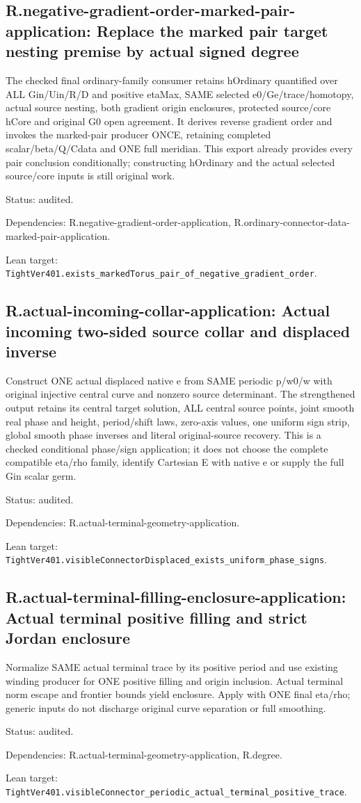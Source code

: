 \documentclass{article}
\begin{document}
\subsection*{R.negative-gradient-order-marked-pair-application: Replace the marked pair target nesting premise by actual signed degree}
The checked final ordinary-family consumer retains hOrdinary quantified over ALL Gin/Uin/R/D and positive etaMax, SAME selected e0/Ge/trace/homotopy, actual source nesting, both gradient origin enclosures, protected source/core hCore and original G0 open agreement. It derives reverse gradient order and invokes the marked-pair producer ONCE, retaining completed scalar/beta/Q/Cdata and ONE full meridian. This export already provides every pair conclusion conditionally; constructing hOrdinary and the actual selected source/core inputs is still original work.
\par Status: audited.
\par Dependencies: R.negative-gradient-order-application, R.ordinary-connector-data-marked-pair-application.
\par Lean target: \texttt{TightVer401.exists\_markedTorus\_pair\_of\_negative\_gradient\_order}.
\subsection*{R.actual-incoming-collar-application: Actual incoming two-sided source collar and displaced inverse}
Construct ONE actual displaced native e from SAME periodic p/w0/w with original injective central curve and nonzero source determinant. The strengthened output retains its central target solution, ALL central source points, joint smooth real phase and height, period/shift laws, zero-axis values, one uniform sign strip, global smooth phase inverses and literal original-source recovery. This is a checked conditional phase/sign application; it does not choose the complete compatible eta/rho family, identify Cartesian E with native e or supply the full Gin scalar germ.
\par Status: audited.
\par Dependencies: R.actual-terminal-geometry-application.
\par Lean target: \texttt{TightVer401.visibleConnectorDisplaced\_exists\_uniform\_phase\_signs}.
\subsection*{R.actual-terminal-filling-enclosure-application: Actual terminal positive filling and strict Jordan enclosure}
Normalize SAME actual terminal trace by its positive period and use existing winding producer for ONE positive filling and origin inclusion. Actual terminal norm escape and frontier bounds yield enclosure. Apply with ONE final eta/rho; generic inputs do not discharge original curve separation or full smoothing.
\par Status: audited.
\par Dependencies: R.actual-terminal-geometry-application, R.degree.
\par Lean target: \texttt{TightVer401.visibleConnector\_periodic\_actual\_terminal\_positive\_trace}.
\end{document}

